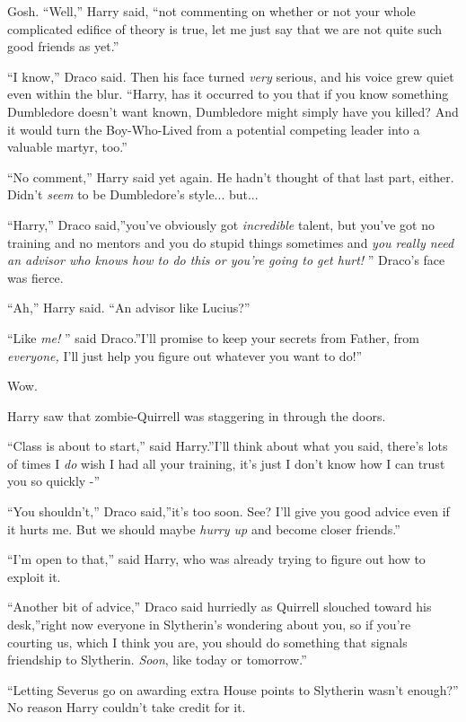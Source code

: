 Gosh. ``Well,'' Harry said, ``not commenting on whether or not your
whole complicated edifice of theory is true, let me just say that we are
not quite such good friends as yet.''

``I know,'' Draco said. Then his face turned \emph{very} serious, and
his voice grew quiet even within the blur. ``Harry, has it occurred to
you that if you know something Dumbledore doesn't want known, Dumbledore
might simply have you killed? And it would turn the Boy-Who-Lived from a
potential competing leader into a valuable martyr, too.''

``No comment,'' Harry said yet again. He hadn't thought of that last
part, either. Didn't \emph{seem} to be Dumbledore's style...
but...

``Harry,'' Draco said,''you've obviously got \emph{incredible} talent,
but you've got no training and no mentors and you do stupid things
sometimes and \emph{you really need an advisor who knows how to do this
or you're going to get hurt!} '' Draco's face was fierce.

``Ah,'' Harry said. ``An advisor like Lucius?''

``Like \emph{me!} '' said Draco.''I'll promise to keep your secrets from
Father, from \emph{everyone,} I'll just help you figure out whatever you
want to do!''

Wow.

Harry saw that zombie-Quirrell was staggering in through the doors.

``Class is about to start,'' said Harry.''I'll think about what you
said, there's lots of times I \emph{do} wish I had all your training,
it's just I don't know how I can trust you so quickly -''

``You shouldn't,'' Draco said,''it's too soon. See? I'll give you good
advice even if it hurts me. But we should maybe \emph{hurry up} and
become closer friends.''

``I'm open to that,'' said Harry, who was already trying to figure out
how to exploit it.

``Another bit of advice,'' Draco said hurriedly as Quirrell slouched
toward his desk,''right now everyone in Slytherin's wondering about you,
so if you're courting us, which I think you are, you should do something
that signals friendship to Slytherin. \emph{Soon}, like today or
tomorrow.''

``Letting Severus go on awarding extra House points to Slytherin wasn't
enough?'' No reason Harry couldn't take credit for it.

